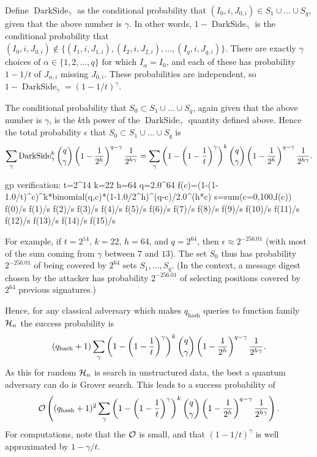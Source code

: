 \def\darkside{\operatorname{DarkSide}}

Define $\darkside_\gamma$
as the conditional probability
that $(I_0,i,J_{0,i})\in S_1\cup\dots\cup S_q$,
given that the above number is $\gamma$.
In other words,
$1-\darkside_\gamma$
is the conditional probability that
$(I_0,i,J_{0,i})\notin \{(I_1,i,J_{1,i}),(I_2,i,J_{2,i}),\dots,(I_q,i,J_{q,i})\}$.
There are exactly $\gamma$ choices of $\alpha\in\{1,2,\dots,q\}$
for which $I_\alpha=I_0$,
and each of these has probability $1-1/t$ of $J_{\alpha,i}$ missing $J_{0,i}$.
These probabilities are independent,
so $1-\darkside_\gamma=(1-1/t)^\gamma$.

The conditional probability that $S_0\subset S_1\cup\dots\cup S_q$,
again given that the above number is $\gamma$,
is the $k$th power of the $\darkside_\gamma$ quantity defined above.
Hence the total probability $\epsilon$ that $S_0\subset S_1\cup\dots\cup S_q$
is
$$
\sum_\gamma
  \darkside_\gamma^k
  {q\choose \gamma}
  \left(1-{1\over 2^h}\right)^{q-\gamma}
  {1\over 2^{h\gamma}}
= \sum_\gamma
  \left(1-\left(1-{1\over t}\right)^\gamma\right)^k
  {q\choose \gamma}
  \left(1-{1\over 2^h}\right)^{q-\gamma}
  {1\over 2^{h\gamma}}
.$$

 gp verification:
t=2^14
k=22
h=64
q=2.0^64
f(c)=(1-(1-1.0/t)^c)^k*binomial(q,c)*(1-1.0/2^h)^(q-c)/2.0^(h*c)
s=sum(c=0,100,f(c))
f(0)/s
f(1)/s
f(2)/s
f(3)/s
f(4)/s
f(5)/s
f(6)/s
f(7)/s
f(8)/s
f(9)/s
f(10)/s
f(11)/s
f(12)/s
f(13)/s
f(14)/s
f(15)/s
\fi

For example,
if $t=2^{14}$, $k=22$, $h=64$, and $q=2^{64}$,
then $\epsilon\approx 2^{-256.01}$
(with most of the sum coming from $\gamma$ between $7$ and $13$).
The set $S_0$ thus has probability $2^{-256.01}$
of being covered by $2^{64}$ sets $S_1,\dots,S_q$.
(In the \spx context,
a message digest chosen by the attacker has probability $2^{-256.01}$
of selecting positions covered by $2^{64}$ previous signatures.)

Hence, for any classical adversary which makes $q_{\text{hash}}$ queries to
function family $\mathcal{H}_n$ the success probability is
$$
(q_{\text{hash}}+1) \sum_\gamma
  \left(1-\left(1-{1\over t}\right)^\gamma\right)^k
  {q\choose \gamma}
  \left(1-{1\over 2^h}\right)^{q-\gamma}
  {1\over 2^{h\gamma}}
  .$$
As this for random $\mathcal{H}_n$ is search in unstructured data, the best a quantum
adversary can do is Grover search. This leads to a success probability of
$$
\mathcal{O}\left((q_{\text{hash}}+1)^2 \sum_\gamma
  \left(1-\left(1-{1\over t}\right)^\gamma\right)^k
  {q\choose \gamma}
  \left(1-{1\over 2^h}\right)^{q-\gamma}
  {1\over 2^{h\gamma}}\right)
  .$$
For computations, note that the $\mathcal{O}$ is small,
and that $(1-1/t)^\gamma$ is well approximated by $1-\gamma/t$.

